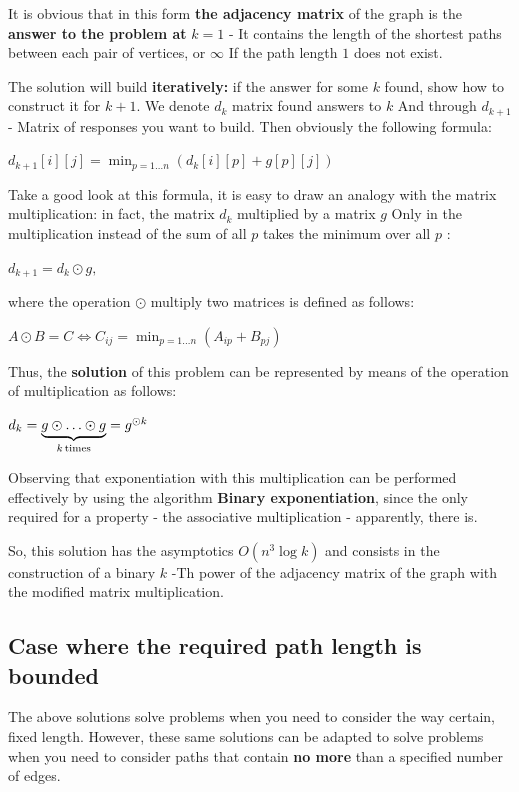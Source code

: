 It is obvious that in this form \textbf{the adjacency matrix} of the graph is the \textbf{answer to the problem at} \textbf{$k = 1$} - It contains the length of the shortest paths between each pair of vertices, or $\infty$ If the path length $1$ does not exist.

The solution will build \textbf{iteratively:} if the answer for some $k$ found, show how to construct it for $k +1$. We denote $d_k$ matrix found answers to $k$ And through $d_ {k +1}$ - Matrix of responses you want to build. Then obviously the following formula:

$d_{k+1}[i][j]=\min_{p=1\ldots n}(d_{k}[i][p]+g[p][j])$

Take a good look at this formula, it is easy to draw an analogy with the matrix multiplication: in fact, the matrix $d_k$ multiplied by a matrix $g$ Only in the multiplication instead of the sum of all $p$ takes the minimum over all $p$ :

$d_ {k +1} = d_k \odot g,$

where the operation $\odot$ multiply two matrices is defined as follows:

$A\odot B=C\Longleftrightarrow C_{ij}=\min_{p=1\ldots n}(A_{ip}+B_{pj})$

Thus, the \textbf{solution} of this problem can be represented by means of the operation of multiplication as follows:

$d_{k}=\underbrace{g\odot\ldots\odot g}_{k{\rm \, times}}=g^{\odot k}$

Observing that exponentiation with this multiplication can be performed effectively by using the algorithm \textbf{Binary exponentiation}, since the only required for a property - the associative multiplication - apparently, there is.

So, this solution has the asymptotics $O (n ^ 3 \log k)$ and consists in the construction of a binary $k$ -Th power of the adjacency matrix of the graph with the modified matrix multiplication.

\subsection{ Case where the required path length is bounded }

The above solutions solve problems when you need to consider the way certain, fixed length. However, these same solutions can be adapted to solve problems when you need to consider paths that contain \textbf{no more} than a specified number of edges.

